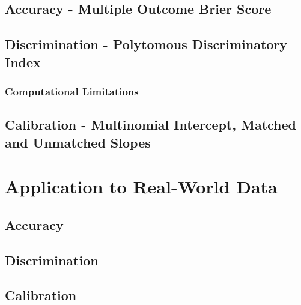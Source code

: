 \documentclass[12pt,PhD,twoside,openright]{muthesis}
\begin{document}
\hypertarget{accuracy---multiple-outcome-brier-score}{%
\subsection{Accuracy - Multiple Outcome Brier Score}\label{accuracy---multiple-outcome-brier-score}}

\hypertarget{discrimination---polytomous-discriminatory-index}{%
\subsection{Discrimination - Polytomous Discriminatory Index}\label{discrimination---polytomous-discriminatory-index}}

\hypertarget{computational-limitations}{%
\subsubsection{Computational Limitations}\label{computational-limitations}}

\hypertarget{calibration---multinomial-intercept-matched-and-unmatched-slopes}{%
\subsection{Calibration - Multinomial Intercept, Matched and Unmatched Slopes}\label{calibration---multinomial-intercept-matched-and-unmatched-slopes}}

\hypertarget{application-to-real-world-data}{%
\section{Application to Real-World Data}\label{application-to-real-world-data}}

\hypertarget{accuracy}{%
\subsection{Accuracy}\label{accuracy}}

\hypertarget{discrimination}{%
\subsection{Discrimination}\label{discrimination}}

\hypertarget{calibration}{%
\subsection{Calibration}\label{calibration}}
\end{document}
